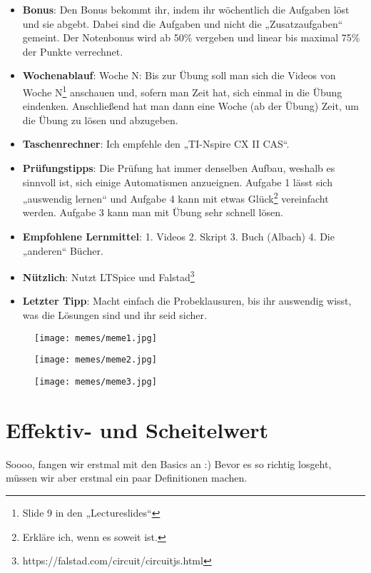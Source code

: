 \documentclass[11pt,a4paper]{article}
\begin{document}
\begin{itemize}
    \item \textbf{Bonus}: Den Bonus bekommt ihr, indem ihr wöchentlich die Aufgaben löst und sie abgebt. Dabei sind die Aufgaben und nicht die „Zusatzaufgaben“ gemeint. Der Notenbonus wird ab 50\% vergeben und linear bis maximal 75\% der Punkte verrechnet.
    \item \textbf{Wochenablauf}: Woche N: Bis zur Übung soll man sich die Videos von Woche N\footnote{Slide 9 in den „Lectureslides“} anschauen und, sofern man Zeit hat, sich einmal in die Übung eindenken. Anschließend hat man dann eine Woche (ab der Übung) Zeit, um die Übung zu lösen und abzugeben.
    \item \textbf{Taschenrechner}: Ich empfehle den „TI-Nspire CX II CAS“.
    \item \textbf{Prüfungstipps}: Die Prüfung hat immer denselben Aufbau, weshalb es sinnvoll ist, sich einige Automatismen anzueignen. Aufgabe 1 lässt sich „auswendig lernen“ und Aufgabe 4 kann mit etwas Glück\footnote{Erkläre ich, wenn es soweit ist.} vereinfacht werden. Aufgabe 3 kann man mit Übung sehr schnell lösen.
    \item \textbf{Empfohlene Lernmittel}: 1. Videos 2. Skript 3. Buch (Albach) 4. Die „anderen“ Bücher.
    \item \textbf{Nützlich}: Nutzt LTSpice und Falstad\footnote{https://falstad.com/circuit/circuitjs.html}
    \item \textbf{Letzter Tipp}: Macht einfach die Probeklausuren, bis ihr auswendig wisst, was die Lösungen sind und ihr seid sicher. 
\end{itemize}


\begin{figure}[h]
    \centering
    \begin{minipage}{0.3\textwidth}
        \centering
        \texttt{[image: memes/meme1.jpg]}
    \end{minipage}
    \begin{minipage}{0.3\textwidth}
        \centering
        \texttt{[image: memes/meme2.jpg]}
    \end{minipage}
    \begin{minipage}{0.3\textwidth}
        \centering
        \texttt{[image: memes/meme3.jpg]}
    \end{minipage}
\end{figure}

\newpage
\raggedright
\section{Effektiv- und Scheitelwert}
Soooo, fangen wir erstmal mit den Basics an :) Bevor es so richtig losgeht, müssen wir aber erstmal ein paar Definitionen machen.
\end{document}
